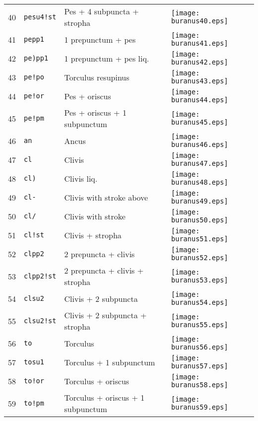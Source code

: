 \documentclass{scrarticle}
\begin{document}
\begin{longtable}{l|l|l|l}
40 & \texttt{pesu4!st} & Pes + 4 subpuncta + stropha & \texttt{[image: buranus40.eps]} \\
41 & \texttt{pepp1} & 1 prepunctum + pes & \texttt{[image: buranus41.eps]} \\
42 & \texttt{pe)pp1} & 1 prepunctum + pes liq. & \texttt{[image: buranus42.eps]} \\
43 & \texttt{pe!po} & Torculus resupinus & \texttt{[image: buranus43.eps]} \\
44 & \texttt{pe!or} & Pes + oriscus & \texttt{[image: buranus44.eps]} \\
45 & \texttt{pe!pm} & Pes + oriscus + 1 subpunctum & \texttt{[image: buranus45.eps]} \\
46 & \texttt{an} & Ancus & \texttt{[image: buranus46.eps]} \\
47 & \texttt{cl} & Clivis & \texttt{[image: buranus47.eps]} \\
48 & \texttt{cl)} & Clivis liq. & \texttt{[image: buranus48.eps]} \\
49 & \texttt{cl-} & Clivis with stroke above & \texttt{[image: buranus49.eps]} \\
50 & \texttt{cl/} & Clivis with stroke & \texttt{[image: buranus50.eps]} \\
51 & \texttt{cl!st} & Clivis + stropha & \texttt{[image: buranus51.eps]} \\
52 & \texttt{clpp2} & 2 prepuncta + clivis & \texttt{[image: buranus52.eps]} \\
53 & \texttt{clpp2!st} & 2 prepuncta + clivis + stropha & \texttt{[image: buranus53.eps]} \\
54 & \texttt{clsu2} & Clivis + 2 subpuncta & \texttt{[image: buranus54.eps]} \\
55 & \texttt{clsu2!st} & Clivis + 2 subpuncta + stropha & \texttt{[image: buranus55.eps]} \\
56 & \texttt{to} & Torculus & \texttt{[image: buranus56.eps]} \\
57 & \texttt{tosu1} & Torculus + 1 subpunctum & \texttt{[image: buranus57.eps]} \\
58 & \texttt{to!or} & Torculus + oriscus & \texttt{[image: buranus58.eps]} \\
59 & \texttt{to!pm} & Torculus + oriscus + 1 subpunctum & \texttt{[image: buranus59.eps]} \\

\end{longtable}
\end{document}
